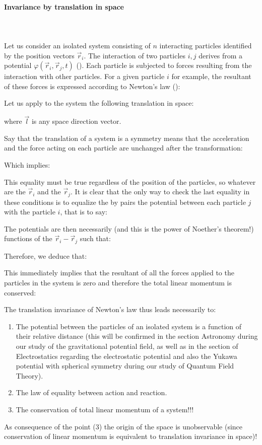 	\paragraph{Invariance by translation in space}\mbox{}\\\\
	Let us consider an isolated system consisting of $n$ interacting particles identified by the position vectors $\vec{r}_i$. The interaction of two particles $i, j$ derives from a potential $\varphi(\vec{r}_i,\vec{r}_j,t)$ (). Each particle is subjected to forces resulting from the interaction with other particles. For a given particle $i$ for example, the resultant of these forces is expressed according to Newton's law ():
	
	Let us apply to the system the following translation in space:
	
	where $\vec{l}$ is any space direction vector.

	Say that the translation of a system is a symmetry means that the acceleration and the force acting on each particle are unchanged after the transformation:
	
	Which implies:
	
	This equality must be true regardless of the position of the particles, so whatever are the $\vec{r}_i$ and the $\vec{r}_j$. It is clear that the only way to check the last equality in these conditions is to equalize the by pairs the potential between each particle $j$ with the particle $i$, that is to say:
	
	The potentials are then necessarily (and this is the power of Noether's theorem!) functions of the $\vec{r}_i-\vec{r}_j$ such that:
	
	Therefore, we deduce that:
	
	This immediately implies that the resultant of all the forces applied to the particles in the system is zero and therefore the total linear momentum is conserved:
	
	The translation invariance of Newton's law thus leads necessarily to:
	\begin{enumerate}
		\item The potential between the particles of an isolated system is a function of their relative distance (this will be confirmed in the section Astronomy during our study of the gravitational potential field, as well as in the section of Electrostatics regarding the electrostatic potential and also the Yukawa potential with spherical symmetry during our study of Quantum Field Theory).

		\item The law of equality between action and reaction.

		\item The conservation of total linear momentum of a system!!!
	\end{enumerate}
	As consequence of the point (3) the origin of the space is unobservable (since conservation of linear momentum is equivalent to translation invariance in space)!
	
